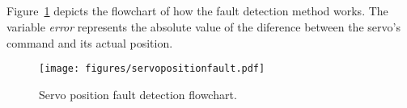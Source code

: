 \subsection{\secnameFlowchart}

Figure~\ref{fig:servoposfault} depicts the flowchart of how the fault detection method works. The variable \emph{error} represents the absolute value of the diference between the servo's command and its actual position.

\begin{figure}[htbp]
\begin{center}
\texttt{[image: figures/servopositionfault.pdf]}
\end{center}
\caption{Servo position fault detection flowchart.}\label{fig:servoposfault}
\end{figure}
